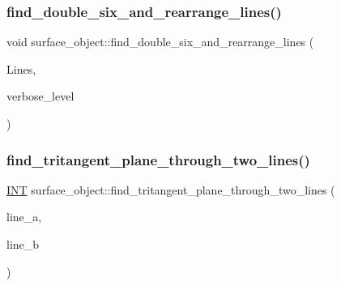 \mbox{\label{classsurface__object_aa2fc4ff039e9f3a5ac29718e29b6b90c}} 
\subsubsection{\texorpdfstring{find\+\_\+double\+\_\+six\+\_\+and\+\_\+rearrange\+\_\+lines()}{find\_double\_six\_and\_rearrange\_lines()}}
{\footnotesize\ttfamily void surface\+\_\+object\+::find\+\_\+double\+\_\+six\+\_\+and\+\_\+rearrange\+\_\+lines (\begin{DoxyParamCaption}\item[{\mbox{\hyperlink{galois_8h_a09fddde158a3a20bd2dcadb609de11dc}{I\+NT}} $\ast$}]{Lines,  }\item[{\mbox{\hyperlink{galois_8h_a09fddde158a3a20bd2dcadb609de11dc}{I\+NT}}}]{verbose\+\_\+level }\end{DoxyParamCaption})}

\mbox{\label{classsurface__object_a3208e9a0a373dccc4569bf14b618dc9d}} 
\subsubsection{\texorpdfstring{find\+\_\+tritangent\+\_\+plane\+\_\+through\+\_\+two\+\_\+lines()}{find\_tritangent\_plane\_through\_two\_lines()}}
{\footnotesize\ttfamily \mbox{\hyperlink{galois_8h_a09fddde158a3a20bd2dcadb609de11dc}{I\+NT}} surface\+\_\+object\+::find\+\_\+tritangent\+\_\+plane\+\_\+through\+\_\+two\+\_\+lines (\begin{DoxyParamCaption}\item[{\mbox{\hyperlink{galois_8h_a09fddde158a3a20bd2dcadb609de11dc}{I\+NT}}}]{line\+\_\+a,  }\item[{\mbox{\hyperlink{galois_8h_a09fddde158a3a20bd2dcadb609de11dc}{I\+NT}}}]{line\+\_\+b }\end{DoxyParamCaption})}

